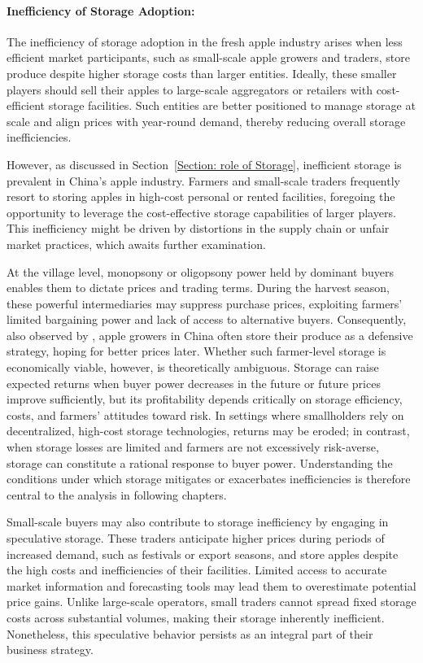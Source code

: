 \paragraph{Inefficiency of Storage Adoption:}
The inefficiency of storage adoption in the fresh apple industry arises when less efficient market participants, such as small-scale apple growers and traders, store produce despite higher storage costs than larger entities. Ideally, these smaller players should sell their apples to large-scale aggregators or retailers with cost-efficient storage facilities. Such entities are better positioned to manage storage at scale and align prices with year-round demand, thereby reducing overall storage inefficiencies.

However, as discussed in Section~\ref{Section: role of Storage}, inefficient storage is prevalent in China's apple industry. Farmers and small-scale traders frequently resort to storing apples in high-cost personal or rented facilities, foregoing the opportunity to leverage the cost-effective storage capabilities of larger players. This inefficiency might be driven by distortions in the supply chain or unfair market practices, which awaits further examination.

At the village level, monopsony or oligopsony power held by dominant buyers enables them to dictate prices and trading terms. During the harvest season, these powerful intermediaries may suppress purchase prices, exploiting farmers' limited bargaining power and lack of access to alternative buyers. Consequently, also observed by \cite{jin2024losses}, apple growers in China often store their produce as a defensive strategy, hoping for better prices later. Whether such farmer-level storage is economically viable, however, is theoretically ambiguous. Storage can raise expected returns when buyer power decreases in the future or future prices improve sufficiently, but its profitability depends critically on storage efficiency, costs, and farmers' attitudes toward risk. In settings where smallholders rely on decentralized, high-cost storage technologies, returns may be eroded; in contrast, when storage losses are limited and farmers are not excessively risk-averse, storage can constitute a rational response to buyer power. Understanding the conditions under which storage mitigates or exacerbates inefficiencies is therefore central to the analysis in following chapters.

Small-scale buyers may also contribute to storage inefficiency by engaging in speculative storage. These traders anticipate higher prices during periods of increased demand, such as festivals or export seasons, and store apples despite the high costs and inefficiencies of their facilities. Limited access to accurate market information and forecasting tools may lead them to overestimate potential price gains. Unlike large-scale operators, small traders cannot spread fixed storage costs across substantial volumes, making their storage inherently inefficient. Nonetheless, this speculative behavior persists as an integral part of their business strategy.

